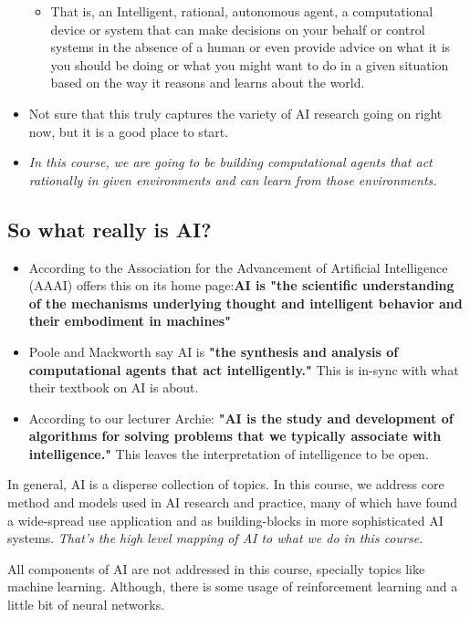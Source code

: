 \documentclass[12pt]{article}
\begin{document}
\begin{itemize}
\begin{itemize}
        \item That is, an Intelligent, rational, autonomous agent, a computational device or system that can make decisions on your behalf or control systems in the absence of a human or even provide advice on what it is you should be doing or what you might want to do in a given situation based on the way it reasons and learns about the world.
    \end{itemize}
    \item Not sure that this truly captures the variety of AI research going on right now, but it is a good place to start. 
    \item \emph{In this course, we are going to be building computational agents that act rationally in given environments and can learn from those environments.}
\end{itemize}

\subsection{So what really is AI?}
\begin{itemize}
    \item According to the Association for the Advancement of Artificial Intelligence (AAAI) offers this on its home page:\textbf{AI is "the scientific understanding of the mechanisms underlying thought and intelligent behavior and their embodiment in machines"}
    \item Poole and Mackworth say AI is \textbf{"the synthesis and analysis of computational agents that act intelligently."} This is in-sync with what their textbook on AI is about.
    \item According to our lecturer Archie: \textbf{"AI is the study and development of algorithms for solving problems that we typically associate with intelligence."} This leaves the interpretation of intelligence to be open.
\end{itemize}

\noindent In general, AI is a disperse collection of topics. In this course, we address core method and models used in AI research and practice, many of which have found a wide-spread use application and as building-blocks in more sophisticated AI systems. 
\emph{That's the high level mapping of AI to what we do in this course.}

\noindent All components of AI are not addressed in this course, specially topics like machine learning. Although, there is some usage of reinforcement learning and a little bit of neural networks.
\end{document}
